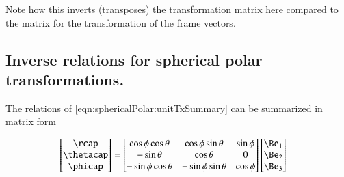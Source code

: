 Note how this inverts (transposes) the transformation matrix here
compared to the matrix for the transformation of the frame vectors.

%
%

\subsection{Inverse relations for spherical polar transformations. }

The relations of \ref{eqn:sphericalPolar:unitTxSummary} can be summarized in matrix form

\begin{align}\label{eqn:sphericalPolar:sphericalPolarRotationMatrixForFrameVectors}
\begin{bmatrix}
\rcap \\
\thetacap \\
\phicap \\
\end{bmatrix}
&=
\begin{bmatrix}
\cos\phi \cos\theta & \cos\phi \sin\theta & \sin\phi \\
- \sin\theta & \cos\theta & 0 \\
- \sin\phi \cos\theta & - \sin\phi \sin\theta & \cos\phi \\
\end{bmatrix}
\begin{bmatrix}
\Be_1 \\
\Be_2 \\
\Be_3 \\
\end{bmatrix}
\end{align}

